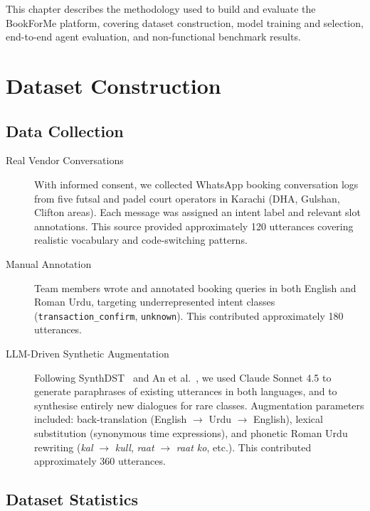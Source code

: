 This chapter describes the methodology used to build and evaluate the BookForMe
platform, covering dataset construction, model training and selection, end-to-end
agent evaluation, and non-functional benchmark results.

\section{Dataset Construction}
\label{sec:results-dataset}

\subsection{Data Collection}

\begin{description}
  \item[Real Vendor Conversations]
        With informed consent, we collected WhatsApp booking conversation logs from
        five futsal and padel court operators in Karachi (DHA, Gulshan, Clifton areas).
        Each message was assigned an intent label and relevant slot annotations.
        This source provided approximately 120 utterances covering realistic
        vocabulary and code-switching patterns.

  \item[Manual Annotation]
        Team members wrote and annotated booking queries in both English and Roman Urdu,
        targeting underrepresented intent classes (\texttt{transaction\_confirm},
        \texttt{unknown}).  This contributed approximately 180 utterances.

  \item[LLM-Driven Synthetic Augmentation]
        Following SynthDST~\cite{he2024} and An et al.~\cite{an2022}, we used       Claude Sonnet 4.5 to generate paraphrases of existing utterances in both languages,
        and to synthesise entirely new dialogues for rare classes.  Augmentation
        parameters included: back-translation (English $\to$ Urdu $\to$ English),
        lexical substitution (synonymous time expressions), and phonetic Roman Urdu
        rewriting (\textit{kal} $\to$ \textit{kull}, \textit{raat} $\to$
        \textit{raat ko}, etc.).  This contributed approximately 360 utterances.
\end{description}

\subsection{Dataset Statistics}

